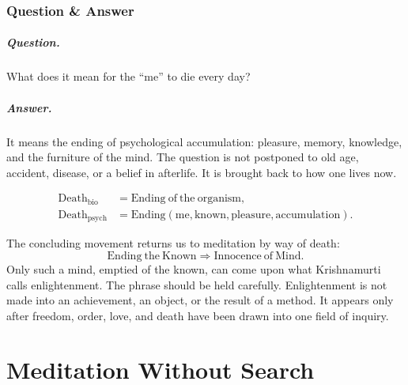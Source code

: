 \documentclass[11pt,oneside]{book}
\begin{document}
\subsection{Question \& Answer}

\paragraph{Question.}
What does it mean for the ``me'' to die every day?

\paragraph{Answer.}
It means the ending of psychological accumulation: pleasure, memory, knowledge, and the furniture of the mind. The question is not postponed to old age, accident, disease, or a belief in afterlife. It is brought back to how one lives now.

\begin{align}
\mathrm{Death}_{\mathrm{bio}} &=
\mathrm{Ending\ of\ the\ organism},\\
\mathrm{Death}_{\mathrm{psych}} &=
\mathrm{Ending}(\mathrm{me},\mathrm{known},\mathrm{pleasure},\mathrm{accumulation}).
\end{align}

The concluding movement returns us to meditation by way of death:
\begin{equation}
\mathrm{Ending\ the\ Known}
\Rightarrow
\mathrm{Innocence\ of\ Mind}.
\end{equation}
Only such a mind, emptied of the known, can come upon what Krishnamurti calls enlightenment. The phrase should be held carefully. Enlightenment is not made into an achievement, an object, or the result of a method. It appears only after freedom, order, love, and death have been drawn into one field of inquiry.


\chapter{Meditation Without Search}
\end{document}
